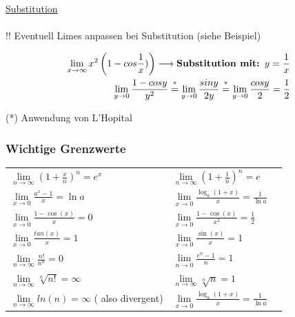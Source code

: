 \documentclass[6pt]{article}
\begin{document}
\begin{multicols*}{3}
   \underline{Substitution}\\
   \vspace{-4mm}\\
   !! Eventuell Limes anpassen bei Substitution (siehe Beispiel)
   \vspace{-12mm}
   
   \begin{equation*}
   		\begin{split}
   			\lim\limits_{x \to \infty} x^2 \left(1-cos\frac{1}{x})\right) \longrightarrow \text{\bf Substitution mit: $y =\frac{1}{x}$}  \\
   			\lim\limits_{y \to 0} \frac{1 - cos y}{y^2} \overset{\text{*}}= \lim\limits_{y \to 0} \frac{sin y}{2y} \overset{\text{*}}= \lim\limits_{y \to 0} \frac{cos y}{2} = \frac{1}{2} \\
   		\end{split}
   \end{equation*}
    \vspace{-10mm}
    \begin{center}
    	  (*) Anwendung von L'Hopital
    \end{center}
   \vspace{-10mm}
   

	\subsubsection*{Wichtige Grenzwerte}   
	\vspace{-5mm}
	\begin{doublespace} 
		\begin{tabular}{lll}
				$ \lim\limits_{n \to \infty} \left( 1+\frac{x}{n} \right)^n = e^x \quad \quad $ & 	 $\lim\limits_{n \to \infty} \left( 1+\frac{1}{n} \right)^n = e$\\  
				$ \lim\limits_{x \to 0} \frac{a^x-1}{x} = \ln a $	  	& $ \lim\limits_{x \to 0} \frac{\log_a(1+x)}{x} = \frac{1}{\ln a} $ \\					
				$ \lim\limits_{x \to 0} \frac{1-\cos(x)}{x} = 0 \quad $ 		& $ \lim\limits_{x \to 0} \frac{1-\cos(x)}{x^2} = \frac{1}{2}$ \\
				 $ \lim\limits_{x \to 0} \frac{tan(x)}{x} = 1 $ &  $ \lim\limits_{x \to 0} \frac{\sin(x)}{x} = 1$\\ 	
				$ \lim\limits_{n \to \infty} \frac{n!}{n^n} = 0 \quad $ 		& $\lim\limits_{n \to 0} \frac{e^n -1 }{n} = 1 $ \\
				$ \lim\limits_{n \to \infty} \sqrt[n]{n!} = \infty $ 				& $ \lim\limits_{n \to \infty} \sqrt[n]{n} = 1 $  \\
				$ \lim\limits_{n \to \infty} ln(n) = \infty $ ( also divergent)  & 
				$ \lim\limits_{x \to 0} \frac{\log_a(1+x)}{x} = \frac{1}{\ln a} $ \\		


\end{tabular}
\end{doublespace}
\end{multicols*}
\end{document}
